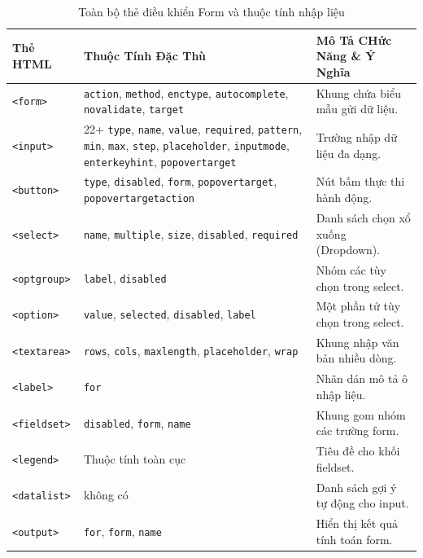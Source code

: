 \documentclass[11pt,oneside]{book}
\newcommand{\codeinline}[1]{\textcolor{accentOrange}{\texttt{#1}}}
\begin{document}
\begin{table}[H]
\centering
\begin{prettyTableBox}
\small
{}
\begin{tabularx}{\linewidth}{lp{3.5cm}X}
\rowcolor{primaryBlue}
\color{white}\textbf{Thẻ HTML} & \color{white}\textbf{Thuộc Tính Đặc Thù} & \color{white}\textbf{Mô Tả CHức Năng \& Ý Nghĩa} \\
\hline
\codeinline{<form>} & \codeinline{action}, \codeinline{method}, \codeinline{enctype}, \codeinline{autocomplete}, \codeinline{novalidate}, \codeinline{target} & Khung chứa biểu mẫu gửi dữ liệu. \\
\codeinline{<input>} & 22+ \codeinline{type}, \codeinline{name}, \codeinline{value}, \codeinline{required}, \codeinline{pattern}, \codeinline{min}, \codeinline{max}, \codeinline{step}, \codeinline{placeholder}, \codeinline{inputmode}, \codeinline{enterkeyhint}, \codeinline{popovertarget} & Trường nhập dữ liệu đa dạng. \\
\codeinline{<button>} & \codeinline{type}, \codeinline{disabled}, \codeinline{form}, \codeinline{popovertarget}, \codeinline{popovertargetaction} & Nút bấm thực thi hành động. \\
\codeinline{<select>} & \codeinline{name}, \codeinline{multiple}, \codeinline{size}, \codeinline{disabled}, \codeinline{required} & Danh sách chọn xổ xuống (Dropdown). \\
\codeinline{<optgroup>} & \codeinline{label}, \codeinline{disabled} & Nhóm các tùy chọn trong select. \\
\codeinline{<option>} & \codeinline{value}, \codeinline{selected}, \codeinline{disabled}, \codeinline{label} & Một phần tử tùy chọn trong select. \\
\codeinline{<textarea>} & \codeinline{rows}, \codeinline{cols}, \codeinline{maxlength}, \codeinline{placeholder}, \codeinline{wrap} & Khung nhập văn bản nhiều dòng. \\
\codeinline{<label>} & \codeinline{for} & Nhãn dán mô tả ô nhập liệu. \\
\codeinline{<fieldset>} & \codeinline{disabled}, \codeinline{form}, \codeinline{name} & Khung gom nhóm các trường form. \\
\codeinline{<legend>} & Thuộc tính toàn cục & Tiêu đề cho khối fieldset. \\
\codeinline{<datalist>} & không có & Danh sách gợi ý tự động cho input. \\
\codeinline{<output>} & \codeinline{for}, \codeinline{form}, \codeinline{name} & Hiển thị kết quả tính toán form. \\
\end{tabularx}
\end{prettyTableBox}
\vspace{-2pt}
\caption{Toàn bộ thẻ điều khiển Form và thuộc tính nhập liệu}
\end{table}
\end{document}

